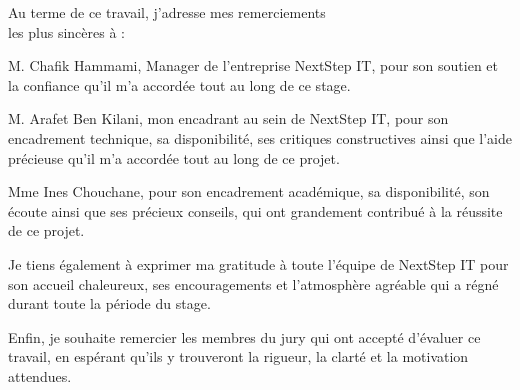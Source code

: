 
\begin{fquote}

\begin{center}

\large{

Au terme de ce travail, j’adresse mes remerciements \\[3pt]
les plus sincères à :

\smallskip

\large{M. Chafik Hammami}, Manager de l’entreprise NextStep IT, pour son soutien et la confiance qu’il m’a accordée tout au long de ce stage.

\smallskip

\large{M. Arafet Ben Kilani}, mon encadrant au sein de NextStep IT, pour son encadrement technique, sa disponibilité, ses critiques constructives ainsi que l’aide précieuse qu’il m’a accordée tout au long de ce projet.

\smallskip

\large{Mme Ines Chouchane}, pour son encadrement académique, sa disponibilité, son écoute ainsi que ses précieux conseils, qui ont grandement contribué à la réussite de ce projet.

\smallskip

Je tiens également à exprimer ma gratitude à toute l’équipe de NextStep IT pour son accueil chaleureux, ses encouragements et l’atmosphère agréable qui a régné durant toute la période du stage.

\smallskip

Enfin, je souhaite remercier les membres du jury qui ont accepté d’évaluer ce travail, en espérant qu’ils y trouveront la rigueur, la clarté et la motivation attendues.


}

\end{center}

\end{fquote}